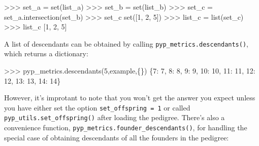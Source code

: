 \documentclass[
  letterpaper,
  DIV=11,
  numbers=noendperiod]{scrreprt}
\newenvironment{Shaded}{\begin{snugshade}}{\end{snugshade}}
\newcommand{\BuiltInTok}[1]{\textcolor[rgb]{0.00,0.23,0.31}{#1}}
\newcommand{\DecValTok}[1]{\textcolor[rgb]{0.68,0.00,0.00}{#1}}
\newcommand{\NormalTok}[1]{\textcolor[rgb]{0.00,0.23,0.31}{#1}}
\newcommand{\OperatorTok}[1]{\textcolor[rgb]{0.37,0.37,0.37}{#1}}
\begin{document}
\begin{Shaded}
\begin{Highlighting}[]
\OperatorTok{\textgreater{}\textgreater{}\textgreater{}}\NormalTok{ set\_a }\OperatorTok{=} \BuiltInTok{set}\NormalTok{(list\_a)}
\OperatorTok{\textgreater{}\textgreater{}\textgreater{}}\NormalTok{ set\_b }\OperatorTok{=} \BuiltInTok{set}\NormalTok{(list\_b)}
\OperatorTok{\textgreater{}\textgreater{}\textgreater{}}\NormalTok{ set\_c }\OperatorTok{=}\NormalTok{ set\_a.intersection(set\_b)}
\OperatorTok{\textgreater{}\textgreater{}\textgreater{}}\NormalTok{ set\_c}
\BuiltInTok{set}\NormalTok{([}\DecValTok{1}\NormalTok{, }\DecValTok{2}\NormalTok{, }\DecValTok{5}\NormalTok{])}
\OperatorTok{\textgreater{}\textgreater{}\textgreater{}}\NormalTok{ list\_c }\OperatorTok{=} \BuiltInTok{list}\NormalTok{(set\_c)}
\OperatorTok{\textgreater{}\textgreater{}\textgreater{}}\NormalTok{ list\_c}
\NormalTok{[}\DecValTok{1}\NormalTok{, }\DecValTok{2}\NormalTok{, }\DecValTok{5}\NormalTok{]}
\end{Highlighting}
\end{Shaded}

A list of descendants can be obtained by calling
\texttt{pyp\_metrics.descendants()}, which returns a dictionary:

\begin{Shaded}
\begin{Highlighting}[]
\OperatorTok{\textgreater{}\textgreater{}\textgreater{}}\NormalTok{ pyp\_metrics.descendants(}\DecValTok{5}\NormalTok{,example,\{\})}
\NormalTok{\{}\DecValTok{7}\NormalTok{: }\DecValTok{7}\NormalTok{, }\DecValTok{8}\NormalTok{: }\DecValTok{8}\NormalTok{, }\DecValTok{9}\NormalTok{: }\DecValTok{9}\NormalTok{, }\DecValTok{10}\NormalTok{: }\DecValTok{10}\NormalTok{, }\DecValTok{11}\NormalTok{: }\DecValTok{11}\NormalTok{, }\DecValTok{12}\NormalTok{: }\DecValTok{12}\NormalTok{, }\DecValTok{13}\NormalTok{: }\DecValTok{13}\NormalTok{, }\DecValTok{14}\NormalTok{: }\DecValTok{14}\NormalTok{\}}
\end{Highlighting}
\end{Shaded}

However, it's improtant to note that you won't get the answer you expect
unless you have either set the option \texttt{set\_offspring\ =\ 1} or
called \texttt{pyp\_utils.set\_offspring()} after loading the pedigree.
There's also a convenience function,
\texttt{pyp\_metrics.founder\_descendants()}, for handling the special
case of obtaining descendants of all the founders in the pedigree:
\end{document}
